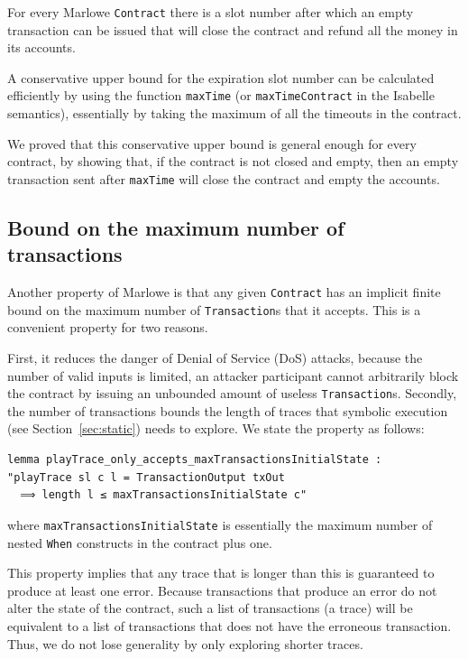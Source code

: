 \documentclass[runningheads]{llncs}
\begin{document}
For every Marlowe \texttt{Contract} there is a slot number after which an empty transaction can be issued that will close the contract and refund all the money in its accounts.

A conservative upper bound for the expiration slot number can be calculated efficiently by using the function \texttt{maxTime} (or \texttt{maxTimeContract} in the Isabelle semantics), essentially by taking the maximum of all the timeouts in the contract.

We proved that this conservative upper bound is general enough for every contract, by showing that, if the contract is not closed and empty, then an empty transaction sent after \texttt{maxTime} will close the contract and empty the accounts.

\subsection{Bound on the maximum number of transactions\label{subsubsec:bound_max_transaction_number}}

Another property of Marlowe is that any given \texttt{Contract} has an implicit finite bound on the maximum number of \texttt{Transaction}s that it accepts. 
This is a convenient property for two reasons. 

First, it reduces the danger of Denial of Service (DoS) attacks, because the number of valid inputs is limited, an attacker participant cannot arbitrarily block the contract by issuing an unbounded amount of useless \texttt{Transaction}s. Secondly, the number of transactions bounds the length of traces that symbolic execution (see Section~\ref{sec:static}) needs to explore.%
We state the property as follows:

\begin{verbatim}
lemma playTrace_only_accepts_maxTransactionsInitialState :
"playTrace sl c l = TransactionOutput txOut
  ⟹ length l ≤ maxTransactionsInitialState c"
\end{verbatim}

\noindent
where \texttt{maxTransactionsInitialState} is essentially the maximum number of nested \texttt{When} constructs in the contract plus one.

This property implies that any trace that is longer than this is guaranteed to produce at least one error. Because transactions that produce an error do not alter the state of the contract, such a list of transactions (a trace) will be equivalent to a list of transactions that does not have the erroneous transaction.
Thus, we do not lose generality by only exploring shorter traces.
\end{document}
